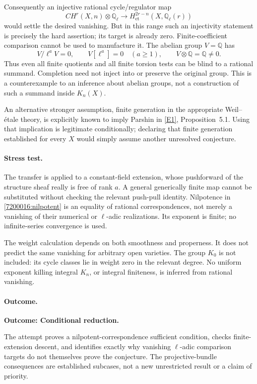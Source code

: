 \documentclass[11pt,a4paper]{article}
\newcommand{\Q}{\mathbb{Q}}
\newcommand{\eref}[2]{\hyperlink{extra:#1:#2}{[E#2]}}
\numberwithin{equation}{section}
\begin{document}
Consequently an injective rational cycle/regulator map
\[
 CH^r(X,n)\otimes\Q_\ell\longrightarrow
 H^{2r-n}_{\mathrm{et}}(X,\Q_\ell(r))
\]
would settle the desired vanishing. But in this range such an injectivity
statement is precisely the hard assertion; its target is already zero.
Finite-coefficient comparison cannot be used to manufacture it. The
abelian group $V=\Q$ has
\[
 V/\ell^aV=0,\qquad V[\ell^a]=0\quad(a\ge1),
 \qquad V\otimes\Q=\Q\ne0.
\]
Thus even all finite quotients and all finite torsion tests can be blind
to a rational summand. Completion need not inject into or preserve the
original group. This is a counterexample to an inference about abelian
groups, not a construction of such a summand inside $K_n(X)$.

An alternative stronger assumption, finite generation in the appropriate
Weil--\'etale theory, is explicitly known to imply Parshin in
\eref{7200016}{1}, Proposition~5.1. Using that implication is legitimate
conditionally; declaring that finite generation established for every
$X$ would simply assume another unresolved conjecture.

\paragraph{Stress test.}
The transfer is applied to a constant-field extension, whose pushforward
of the structure sheaf really is free of rank $a$. A general generically
finite map cannot be substituted without checking the relevant
push-pull identity. Nilpotence in \eqref{7200016:nilpotent} is an equality
of rational correspondences, not merely a vanishing of their numerical
or $\ell$-adic realizations. Its exponent is finite; no infinite-series
convergence is used.

The weight calculation depends on both smoothness and properness. It
does not predict the same vanishing for arbitrary open varieties.
The group $K_0$ is not included: its cycle classes lie in weight zero
in the relevant degree. No uniform exponent killing integral $K_n$, or
integral finiteness, is inferred from rational vanishing.

\paragraph{Outcome.}
\textbf{Outcome: Conditional reduction.}

The attempt proves a nilpotent-correspondence sufficient condition,
checks finite-extension descent, and identifies exactly why vanishing
$\ell$-adic comparison targets do not themselves prove the conjecture.
The projective-bundle consequences are established subcases, not a new
unrestricted result or a claim of priority.
\end{document}
